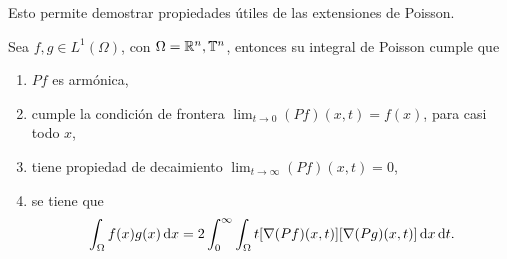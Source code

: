 Esto permite demostrar propiedades útiles de las extensiones de Poisson.
\begin{theorem}\label{theo:prop-Poisson}
	Sea $f,g\in L^1(\Omega)$, con $\Omega=\mathbb{R}^n,\mathbb{T}^n$, entonces su integral de Poisson cumple que
	\begin{enumerate}
		\item $Pf$ es armónica, 
		\item cumple la condición de frontera $\lim_{t\to0}(Pf)(x, t) = f(x)$, para casi todo $x$,
		\item tiene propiedad de decaimiento $\lim_{t\to\infty}(Pf)(x, t) = 0$,
		\item se tiene que 
		\begin{equation*}
			\int_{\Omega} f(x)g(x)\mathop{}\!\mathrm{d} x =2 \int_0^\infty\int_{\Omega} t[\nabla(Pf)(x, t)][\nabla(Pg)(x, t)]\mathop{}\!\mathrm{d} x \mathop{}\!\mathrm{d} t.
		\end{equation*}
	\end{enumerate}
\end{theorem}
